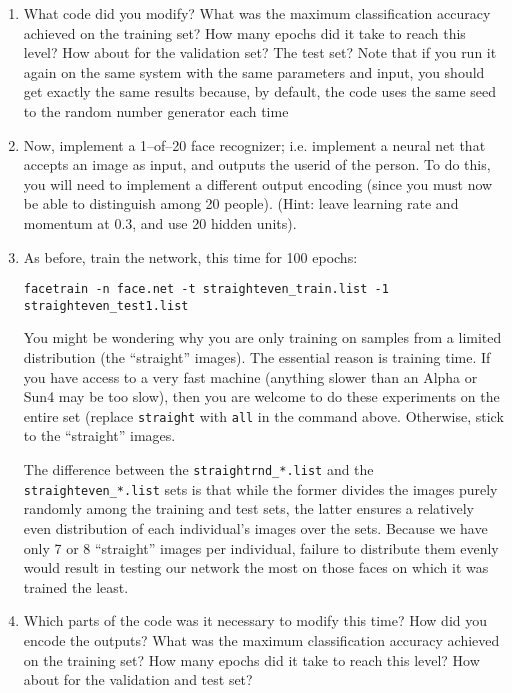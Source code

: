 \begin{enumerate}
\item What code did you modify?  What was the maximum classification accuracy 
achieved on the training set?  How many epochs did it take to reach this
level?  How about for the validation set?  The test set?  Note that if you run
it again on the same system with the same parameters and input, you should get
exactly the same results because, by default, the code uses the same seed to
the random number generator each time

\item Now, implement a 1--of--20 face recognizer; i.e. implement a neural 
net that accepts an image as input, and outputs the userid of the person.  To
do this, you will need to implement a different output encoding (since you
must now be able to distinguish among 20 people).  (Hint: leave learning rate
and momentum at 0.3, and use 20 hidden units).

\item As before, train the network, this time for 100 epochs:

{\tt facetrain -n face.net -t straighteven\_train.list -1 straighteven\_test1.list}

You might be wondering why you are only training on samples from a limited
distribution (the ``straight'' images).  The essential reason is training
time.  If you have access to a very fast machine (anything slower than an
Alpha or Sun4 may be too slow), then you are welcome to do these experiments
on the entire set (replace {\tt straight} with {\tt all} in the command above.
Otherwise, stick to the ``straight'' images.

The difference between the {\tt straightrnd\_*.list} and the {\tt
straighteven\_*.list} sets is that while the former divides the images purely
randomly among the training and test sets, the latter ensures a relatively
even distribution of each individual's images over the sets.  Because we have
only 7 or 8 ``straight'' images per individual, failure to distribute them
evenly would result in testing our network the most on those faces on which it
was trained the least.

\item Which parts of the code was it necessary to modify this time?
How did you encode the outputs?  What was the maximum classification accuracy
achieved on the training set?  How many epochs did it take to reach this
level?  How about for the validation and test set?


\end{enumerate}
